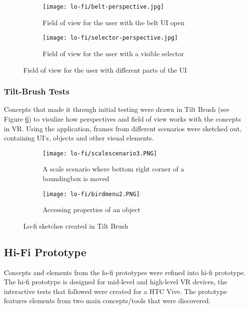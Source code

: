 
\begin{figure}
  \begin{subfigure}{.5\textwidth}
  \centering
  \texttt{[image: lo-fi/belt-perspective.jpg]}
  \caption{Field of view for the user with the belt UI open}
  \label{fig:lofi:fov:belt-ui}
  \end{subfigure}%
  \begin{subfigure}{.5\textwidth}
    \centering
    \texttt{[image: lo-fi/selector-perspective.jpg]}
    \caption{Field of view for the user with a visible selector}
    \label{fig:lofi:fov:selector}
\end{subfigure}
\caption{Field of view for the user with different parts of the UI}
\label{fig:lofi:fov}
\end{figure}


\subsubsection{Tilt-Brush Tests}
Concepts that made it through initial testing were drawn in Tilt Brush (see Figure \ref{fig:lofi:tilt})  to visulize how perspectives and field of view works with the concepts in VR. Using the application, frames from different scenarios were sketched out, containing UI's, objects and other visual elements.


\begin{figure}
\begin{subfigure}{.5\textwidth}
  \centering
  \texttt{[image: lo-fi/scalescenario3.PNG]}
  \caption{A scale scenario where bottom right corner of a boundingbox is moved}
  \label{fig:lofi:tilt:scale3}
\end{subfigure}%
\begin{subfigure}{.5\textwidth}
  \centering
  \texttt{[image: lo-fi/birdmenu2.PNG]}
  \caption{Accessing properties of an object}
  \label{fig:lofi:tilt:passivemenu}
\end{subfigure}
\caption{Lo-fi sketches created in Tilt Brush }
\label{fig:lofi:tilt}
\end{figure}

\subsection{Hi-Fi Prototype}
Concepts and elements from the lo-fi prototypes were refined into hi-fi prototype. The hi-fi prototype is designed for mid-level and high-level VR devices, the interactive tests that followed were created for a HTC Vive. The prototype features elements from two main concepts/tools that were discovered.


